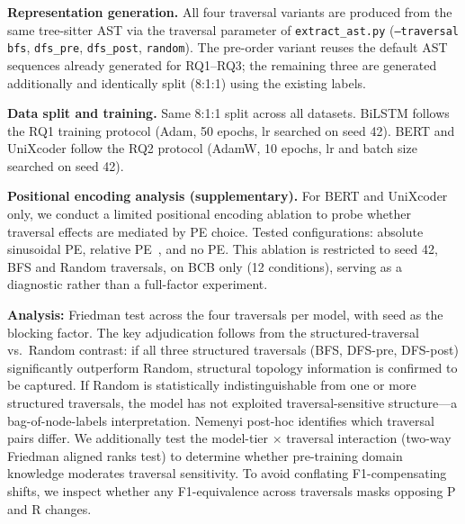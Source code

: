 \documentclass[pdflatex,sn-mathphys,Numbered]{sn-jnl}
\begin{document}
\textbf{Representation generation.} All four traversal variants are produced from the same tree-sitter AST via the traversal parameter of \texttt{extract\_ast.py} (\texttt{--traversal bfs}, \texttt{dfs\_pre}, \texttt{dfs\_post}, \texttt{random}). The pre-order variant reuses the default AST sequences already generated for RQ1--RQ3; the remaining three are generated additionally and identically split (8:1:1) using the existing labels.

\textbf{Data split and training.} Same 8:1:1 split across all datasets. BiLSTM follows the RQ1 training protocol (Adam, 50 epochs, lr searched on seed 42). BERT and UniXcoder follow the RQ2 protocol (AdamW, 10 epochs, lr and batch size searched on seed 42).

\textbf{Positional encoding analysis (supplementary).} For BERT and UniXcoder only, we conduct a limited positional encoding ablation to probe whether traversal effects are mediated by PE choice. Tested configurations: absolute sinusoidal PE, relative PE~\citep{shaw2018relpos}, and no PE. This ablation is restricted to seed 42, BFS and Random traversals, on BCB only (12 conditions), serving as a diagnostic rather than a full-factor experiment.

\textbf{Analysis:} Friedman test across the four traversals per model, with seed as the blocking factor. The key adjudication follows from the structured-traversal vs.\ Random contrast: if all three structured traversals (BFS, DFS-pre, DFS-post) significantly outperform Random, structural topology information is confirmed to be captured. If Random is statistically indistinguishable from one or more structured traversals, the model has not exploited traversal-sensitive structure---a bag-of-node-labels interpretation. Nemenyi post-hoc identifies which traversal pairs differ. We additionally test the model-tier $\times$ traversal interaction (two-way Friedman aligned ranks test) to determine whether pre-training domain knowledge moderates traversal sensitivity. To avoid conflating F1-compensating shifts, we inspect whether any F1-equivalence across traversals masks opposing P and R changes.
\end{document}
